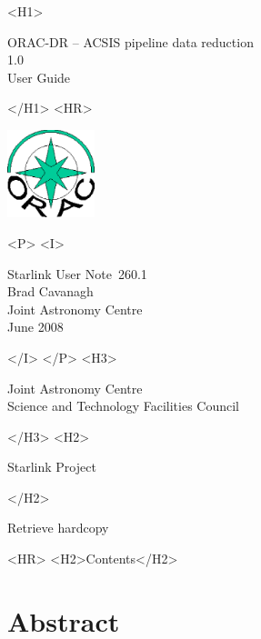 \documentclass[twoside,11pt]{article}
\newcommand{\stardoccategory}  {Starlink User Note}
\newcommand{\stardocsource}    {sun\stardocnumber}
\newcommand{\stardocnumber}    {260.1}
\newcommand{\stardocauthors}   {Brad Cavanagh \\
                                Joint Astronomy Centre}
\newcommand{\stardocdate}      {June 2008}
\newcommand{\stardoctitle}     {ORAC-DR -- ACSIS pipeline data reduction}
\newcommand{\stardocversion}   {1.0}
\newcommand{\stardocmanual}    {User Guide}
\newcommand{\htmladdnormallink}[2]{#1}
\newcommand{\htmladdimg}[1]{}
\newcommand{\htmlref}[2]{#1}
\newcommand{\htmladdtonavigation}[1]{}
\newcommand{\xlabel}[1]{}
\renewcommand{\_}{\texttt{\symbol{95}}}
\begin{document}
\begin{htmlonly}
   \xlabel{}
   \begin{rawhtml} <H1> \end{rawhtml}
      \stardoctitle\\
      \stardocversion\\
      \stardocmanual
   \begin{rawhtml} </H1> <HR> \end{rawhtml}

\includegraphics[width=1.0in]{sun260_logo.eps}

   \begin{rawhtml} <P> <I> \end{rawhtml}
   \stardoccategory\ \stardocnumber \\
   \stardocauthors \\
   \stardocdate
   \begin{rawhtml} </I> </P> <H3> \end{rawhtml}
      \htmladdnormallink{Joint Astronomy Centre}
                        {http://www.jach.hawaii.edu/} \\
      \htmladdnormallink{Science and Technology Facilities Council}
                        {http://www.scitech.ac.uk/} \\
   \begin{rawhtml} </H3> <H2> \end{rawhtml}
      \htmladdnormallink{Starlink Project}{http://www.starlink.ac.uk/}
   \begin{rawhtml} </H2> \end{rawhtml}
   \htmladdnormallink{\htmladdimg{source.gif} Retrieve hardcopy}
      {http://www.starlink.ac.uk/cgi-bin/hcserver?\stardocsource}\\

  \label{stardoccontents}
  \begin{rawhtml}
    <HR>
    <H2>Contents</H2>
  \end{rawhtml}
  \htmladdtonavigation{\htmlref{\htmladdimg{contents_motif.gif}}
        {stardoccontents}}

  \section{\xlabel{abstract}Abstract}
\end{htmlonly}
\end{document}
